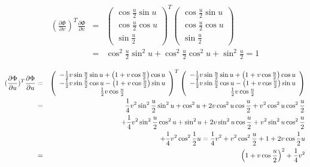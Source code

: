 \begin{eqnarray}
(\frac{\partial \Phi }{\partial v})^{T}\frac{\partial \Phi }{\partial v}&=&\allowbreak \left(
\begin{array}{c}
\cos \frac{u}{2}\sin u \\
\cos \frac{u}{2}\cos u \\
\sin \frac{u}{2}
\end{array}
\right) ^{T}\left(
\begin{array}{c}
\cos \frac{u}{2}\sin u \\
\cos \frac{u}{2}\cos u \\
\sin \frac{u}{2}
\end{array}
\right)
\nonumber \\
&=&
\cos ^{2}\frac{u}{2}\sin ^{2}u+\cos ^{2}\frac{u}{2}\cos ^{2}u+\sin ^{2}%
\frac{u}{2}=\allowbreak 1
\end{eqnarray}


\begin{eqnarray}
(\frac{\partial \Phi }{\partial u})^{T}\frac{\partial \Phi }{\partial u}&=&\allowbreak \left(
\begin{array}{c}
-\frac{1}{2}v\sin \frac{u}{2}\sin u+\left( 1+v\cos \frac{u}{2}\right) \cos
u \\
-\frac{1}{2}v\sin \frac{u}{2}\cos u-\left( 1+v\cos \frac{u}{2}\right) \sin
u \\
\frac{1}{2}v\cos \frac{u}{2}
\end{array}
\right) ^{T}\left(
\begin{array}{c}
-\frac{1}{2}v\sin \frac{u}{2}\sin u+\left( 1+v\cos \frac{u}{2}\right) \cos
u \\
-\frac{1}{2}v\sin \frac{u}{2}\cos u-\left( 1+v\cos \frac{u}{2}\right) \sin
u \\
\frac{1}{2}v\cos \frac{u}{2}
\end{array}
\right)
\nonumber \\
&=&
\frac{1}{4}v^{2}\sin ^{2}\frac{u}{2}\sin ^{2}u+\cos
^{2}u+2 v \cos ^{2}u \cos \frac{u}{2}+
v^{2}\cos ^{2}u  \cos ^{2}\frac{u}{2}
\nonumber \\
&&
+\frac{1}{4}v^{2}\sin ^{2}\frac{u}{2}\cos^{2}u
+\sin ^{2}u+2  v\sin ^{2}u\cos \frac{u}{2}+ v^{2} \sin^{2}u\cos ^{2}\frac{u}{2}
\nonumber \\
&&
+\frac{1}{4}v^{2}\cos ^{2}\frac{1}{2}%
u =\allowbreak \frac{1}{4}v^{2}+v^{2}\cos ^{2}\frac{u}{2}+1+2v\cos \frac{%
1}{2}u
\nonumber \\
&=&\left(1+v\cos \frac{u}{2}\right)^{2}+\frac{1}{4}v^{2}
\end{eqnarray}


